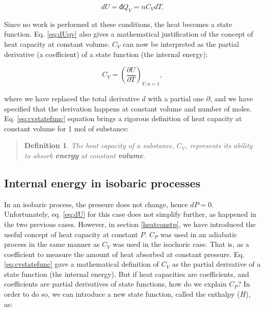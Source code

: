 \documentclass[
  9pt,
]{extbook}
\theoremstyle{definition}
\newtheorem{definition}{Definition}[chapter]
\theoremstyle{definition}
\theoremstyle{definition}
\theoremstyle{remark}
\begin{document}
\begin{equation}
  dU = đ Q_V = n C_V dT.
  \label{eq:dUqv}
\end{equation}

Since no work is performed at these conditions, the heat becomes a state function. Eq. \eqref{eq:dUqv} also gives a mathematical justification of the concept of heat capacity at constant volume. \(C_V\) can now be interpreted as the partial derivative (a coefficient) of a state function (the internal energy):

\begin{equation}
  C_V = \left( \frac{\partial U} {\partial T} \right)_{V,n=1},
  \label{eq:cvstatefunc}
\end{equation}

where we have replaced the total derivative \(d\) with a partial one \(\partial\), and we have specified that the derivation happens at constant volume and number of moles. Eq. \eqref{eq:cvstatefunc} equation brings a rigorous definition of heat capacity at constant volume for 1 mol of substance:

\begin{quote}
\begin{definition}
\protect\hypertarget{def:newdefcv}{}{\label{def:newdefcv} }\emph{The heat capacity of a substance, \(C_V\), represents its ability to absorb \textbf{energy} at constant \textbf{volume}.}
\end{definition}
\end{quote}

\hypertarget{enthalpy}{%
\subsection{Internal energy in isobaric processes}\label{enthalpy}}

In an isobaric process, the pressure does not change, hence \(dP=0\). Unfortunately, eq. \eqref{eq:dU} for this case does not simplify further, as happened in the two previous cases. However, in section \ref{heatconstp}, we have introduced the useful concept of heat capacity at constant \(P\). \(C_P\) was used in an adiabatic process in the same manner as \(C_V\) was used in the isochoric case. That is, as a coefficient to measure the amount of heat absorbed at constant pressure. Eq. \eqref{eq:cvstatefunc} gave a mathematical definition of \(C_V\) as the partial derivative of a state function (the internal energy). But if heat capacities are coefficients, and coefficients are partial derivatives of state functions, how do we explain \(C_P\)? In order to do so, we can introduce a new state function, called the enthalpy (\(H\)), as:
\end{document}
